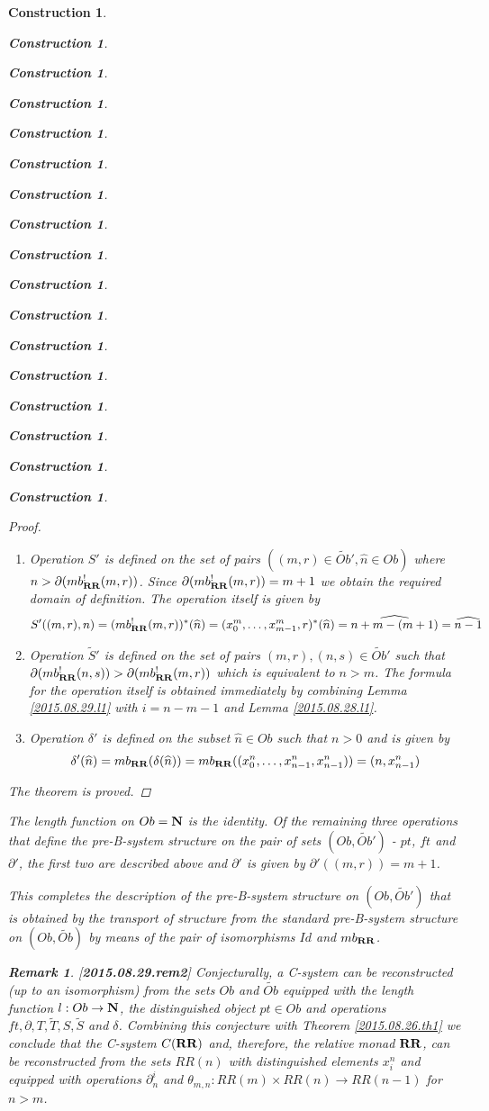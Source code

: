\documentclass[12pt]{amsart}
\newtheorem{remark}[proposition]{Remark}
\newtheorem{construction}[proposition]{Construction}
\newcommand{\llabel}[1]{\label{#1}[{\bf #1}]}
\newcommand{\sr}{\rightarrow}
\newcommand{\nn}{{\bf N\rm}}
\newcommand{\nat}{\nn}
\newcommand{\wt}{\widetilde}
\newcommand{\wh}{\widehat}
\newcommand{\RR}{{\bf RR}}
\begin{document}
\begin{construction}
\begin{construction}
\begin{construction}
\begin{construction}
\begin{construction}
\begin{construction}
\begin{construction}
\begin{construction}
\begin{construction}
\begin{construction}
\begin{construction}
\begin{construction}
\begin{construction}
\begin{construction}
\begin{construction}
\begin{construction}
\begin{construction}
\begin{proof}
\begin{enumerate}
%
\item Operation $S'$ is defined on the set of pairs $((m,r)\in \wt{Ob}',\wh{n}\in Ob)$ where $n>\partial(mb_{\RR}^!(m,r))$. Since $\partial(mb_{\RR}^!(m,r))=m+1$ we obtain the required domain of definition. The operation itself is given by
%
$$S'((m,r),n)=(mb_{\RR}^!(m,r))^*(\wh{n})=(x_0^m,\dots,x_{m-1}^m,r)^*(\wh{n})=\wh{n+m-(m+1)}=\wh{n-1}$$
%
\item Operation $\wt{S}'$ is defined on the set of pairs $(m,r),(n,s)\in \wt{Ob}'$ 
such that $\partial(mb_{\RR}^!(n,s))>\partial(mb_{\RR}^!(m,r))$ which is equivalent to $n>m$. The formula for the operation itself is obtained immediately by combining Lemma \ref{2015.08.29.l1} with $i=n-m-1$ and  Lemma \ref{2015.08.28.l1}. 
%
\item Operation $\delta'$ is defined on the subset $\wh{n}\in Ob$ such that $n>0$ and is given by
%
$$\delta'(\wh{n})=mb_{\RR}(\delta(\wh{n}))=mb_{\RR}((x_0^n,\dots,x_{n-1}^n,x_{n-1}^n))=(n,x_{n-1}^n)$$
%
\end{enumerate}
%
The theorem is proved. 
\end{proof}
%
The length function on $Ob=\nat$ is the identity. Of  the remaining three operations that define the pre-B-system structure on the pair of sets $(Ob,\wt{Ob}')$ - $pt$, $ft$ and $\partial'$, the first two are described above and $\partial'$ is given by $\partial'((m,r))=m+1$. 

This completes the description of the pre-B-system structure on $(Ob,\wt{Ob}')$ that is obtained by the transport of structure from the standard pre-B-system structure on $(Ob,\wt{Ob})$ by means of the pair of isomorphisms $Id$ and $mb_{\RR}$.
%
\begin{remark}\rm
\llabel{2015.08.29.rem2}
Conjecturally, a C-system can be reconstructed (up to an isomorphism) from the sets $Ob$ and $\wt{Ob}$ equipped with the length function $l:Ob\sr\nn$, the distinguished object $pt\in Ob$ and operations $ft, \partial, T,\wt{T},S,\wt{S}$ and $\delta$. Combining this conjecture with Theorem \ref{2015.08.26.th1} we conclude that the C-system $C(\RR)$ and, therefore, the relative monad $\RR$, can be reconstructed from the sets $RR(n)$ with distinguished elements $x^n_i$ and equipped with operations $\partial_n^i$ and $\theta_{m,n}:RR(m)\times RR(n)\sr RR(n-1)$ for $n>m$. 


\end{remark}
\end{construction}
\end{construction}
\end{construction}
\end{construction}
\end{construction}
\end{construction}
\end{construction}
\end{construction}
\end{construction}
\end{construction}
\end{construction}
\end{construction}
\end{construction}
\end{construction}
\end{construction}
\end{construction}
\end{construction}
\end{document}
